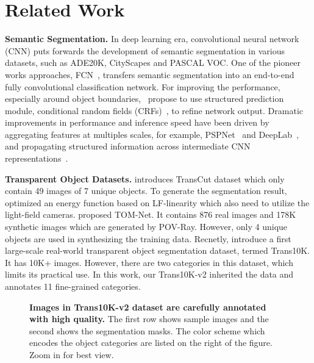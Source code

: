 \documentclass{article}
\begin{document}
\section{Related Work}
\textbf{Semantic Segmentation.}
In deep learning era, convolutional neural network (CNN) puts forwards the development of semantic segmentation in various datasets, such as ADE20K, CityScapes and PASCAL VOC. One of the pioneer works approaches, FCN~\cite{fcn}, transfers semantic segmentation into an end-to-end fully convolutional classification network. For improving the performance, especially around object boundaries,~\cite{deeplab,lin2016efficient,zheng2015conditional} propose to use structured prediction module, conditional random fields (CRFs)~\cite{crf}, to refine network output. Dramatic improvements in performance and inference speed have been driven by aggregating features at multiples scales, for example, PSPNet~\cite{pspnet} and DeepLab~\cite{deeplab,deeplab2}, and propagating structured information across intermediate CNN representations~\cite{gadde2016superpixel,liu2017learning,nonlocal}. 


\textbf{Transparent Object Datasets.}
\cite{transcut} introduces TransCut dataset which only contain 49 images of 7 unique objects. To generate the segmentation result, \cite{transcut} optimized an energy function based on LF-linearity which also need to utilize the light-field cameras.
\cite{tomnet} proposed TOM-Net. It contains 876 real images and 178K synthetic images which are generated by POV-Ray. However, only 4 unique objects are used in synthesizing the training data.
Recnetly, \cite{translab} introduce a first large-scale real-world transparent object segmentation dataset, termed Trans10K. It has 10K+ images. However, there are two categories in this dataset, which limits its practical use. In this work, our Trans10K-v2 inherited the data and annotates 11 fine-grained categories.

\begin{figure*}[t]
    \centering
    \caption{\textbf{Images in Trans10K-v2 dataset are carefully annotated with high quality.} The first row shows sample images and the second shows the segmentation masks. 
The color scheme which encodes the object categories are listed on the right of the figure. Zoom in for best view.}
    \label{fig:visualize}
    \vspace{-10pt}
\end{figure*}
\end{document}
